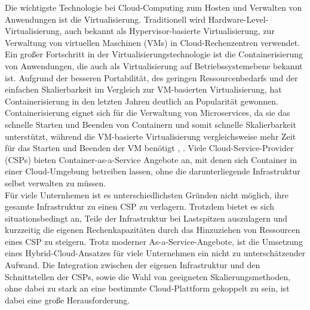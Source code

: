 \documentclass[runningheads]{llncs}
\begin{document}
Die wichtigste Technologie bei Cloud-Computing zum Hosten und Verwalten von Anwendungen ist die Virtualisierung. Traditionell wird Hardware-Level-Virtualisierung, auch bekannt als Hypervisor-basierte Virtualisierung, zur Verwaltung von virtuellen Maschinen (VMs) in Cloud-Rechenzentren verwendet. Ein großer Fortschritt in der Virtualisierungstechnologie ist die Containerisierung von Anwendungen, die auch als Virtualisierung auf Betriebssystemebene bekannt ist. Aufgrund der besseren Portabilität, des geringen Ressourcenbedarfs und der einfachen Skalierbarkeit im Vergleich zur VM-basierten Virtualisierung, hat Containerisierung in den letzten Jahren deutlich an Popularität gewonnen. Containerisierung eignet sich für die Verwaltung von Microservices, da sie das schnelle Starten und Beenden von Containern und somit schnelle Skalierbarkeit unterstützt, während die VM-basierte Virtualisierung vergleichsweise mehr Zeit für das Starten und Beenden der VM benötigt \cite{al-dhuraibi_elasticity_2018}, \cite{abdullah_containers_2019}. Viele Cloud-Service-Provider (CSPs) bieten Container-as-a-Service Angebote an, mit denen sich Container in einer Cloud-Umgebung betreiben lassen, ohne die darunterliegende Infrastruktur selbst verwalten zu müssen. \\

Für viele Unternhemen ist es unterschiedlichsten Gründen nicht möglich, ihre gesamte Infrastruktur zu einen CSP zu verlagern. Trotzdem bietet es sich situationsbedingt an, Teile der Infrastruktur bei Lastspitzen auszulagern und kurzzeitig die eigenen Rechenkapazitäten durch das Hinzuziehen von Ressourcen eines CSP zu steigern.
Trotz moderner As-a-Service-Angebote, ist die Umsetzung eines Hybrid-Cloud-Ansatzes für viele Unternehmen ein nicht zu unterschätzender Aufwand. Die Integration zwischen der eigenen Infrastruktur und den Schnitt\-stellen der CSPs, sowie die Wahl von geeigneten Skalierungsmethoden, ohne dabei zu stark an eine bestimmte Cloud-Plattform gekoppelt zu sein, ist dabei eine große Herausforderung.  \\
\end{document}
